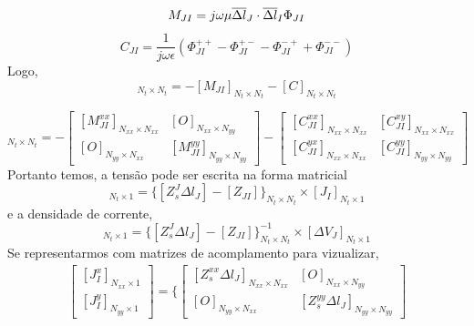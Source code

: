 \documentclass[
	12pt,				%
	openright,			%
	oneside,			%
	a4paper,			%
	english,			%
	brazil				%
	]{abntex2}
\begin{document}
\begin{apendicesenv}
\begin{equation}
   M_{JI}=   
j\omega \mu  \overline{\Delta l}_J \cdot \overline{\Delta l}_I  \Phi_{JI}\\ 
 \\
\end{equation}
\begin{equation}
   C_{JI}=   
 \frac{1}{j \omega \epsilon}  (\Phi_{JI}^{++}-\Phi_{JI}^{+-}-\Phi_{JI}^{-+}+\Phi_{JI}^{--})
\end{equation}
Logo,
\begin{equation}
    [Z_{JI}]_{N_t \times N_t}=-[M_{JI}]_{N_t \times N_t}-[C]_{N_t \times N_t}
\end{equation}

\begin{equation}
 [Z_{JI}]_{N_t \times N_t}=-
   \begin{bmatrix}[M_{JI}^{xx}]_{N_{xx}\times N_{xx}}& [O]_{N_{xx}\times N_{yy}}\\
   [O]_{N_{yy}\times N_{xx}}&[M_{JI}^{yy}]_{N_{yy}\times N_{yy}}
   \end{bmatrix}-
   \begin{bmatrix}[C_{JI}^{xx}]_{N_{xx}\times N_{xx}}& [C_{JI}^{xy}]_{N_{xx}\times N_{xx}}\\
   [C_{JI}^{yx}]_{N_{xx}\times N_{xx}}&[C_{JI}^{yy}]_{N_{yy}\times N_{yy}}
   \end{bmatrix}
\end{equation}
Portanto temos, a tensão pode ser escrita na forma matricial
\begin{equation}
  [\Delta V_J]_{N_t \times 1} =\{ [Z_{s}^J\Delta l_J]-[Z_{JI}]\}_{N_t \times N_t}\times[J_I]_{N_t \times 1}
\end{equation} 
e a densidade de corrente,
\begin{equation}
  [J_I]_{N_t \times 1}=\{ [Z_{s}^J\Delta l_J]-[Z_{JI}]\}^{-1}_{N_t \times N_t} \times[\Delta V_J]_{N_t \times 1} 
\end{equation} 
Se representarmos com matrizes de acomplamento  para vizualizar,
\begin{equation}
\begin{aligned}
  \begin{bmatrix} [J^{x}_I]_{N_{xx}\times 1} \\ [J^{y}_I]_{N_{yy}\times 1}\end{bmatrix}  =\Biggl\{\begin{bmatrix}[Z_s^{xx}\Delta l_J]_{N_{xx}\times N_{xx}}& [O]_{N_{xx}\times N_{yy}}\\
   [O]_{N_{yy}\times N_{xx}}&[Z_s^{yy}\Delta l_J]_{N_{yy}\times N_{yy}}

\end{bmatrix}
\end{aligned}
\end{equation}
\end{apendicesenv}
\end{document}
